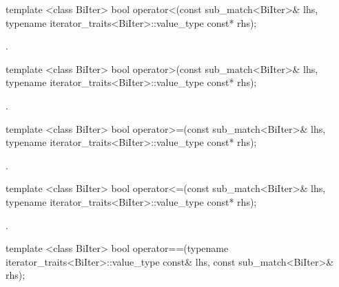 %
%
\begin{itemdecl}
template <class BiIter> 
  bool operator<(const sub_match<BiIter>& lhs, 
                 typename iterator_traits<BiIter>::value_type const* rhs); 
\end{itemdecl}

\begin{itemdescr}
\pnum\returns  {}.
\end{itemdescr}

%
%
\begin{itemdecl}
template <class BiIter> 
  bool operator>(const sub_match<BiIter>& lhs, 
                 typename iterator_traits<BiIter>::value_type const* rhs); 
\end{itemdecl}

\begin{itemdescr}
\pnum\returns  {}.
\end{itemdescr}

%
%
\begin{itemdecl}
template <class BiIter> 
  bool operator>=(const sub_match<BiIter>& lhs, 
                  typename iterator_traits<BiIter>::value_type const* rhs); 
\end{itemdecl}

\begin{itemdescr}
\pnum\returns  {}.
\end{itemdescr}

%
%
\begin{itemdecl}
template <class BiIter> 
  bool operator<=(const sub_match<BiIter>& lhs, 
                  typename iterator_traits<BiIter>::value_type const* rhs); 
\end{itemdecl}

\begin{itemdescr}
\pnum
\returns  {}.
\end{itemdescr}

%
%
\begin{itemdecl}
template <class BiIter> 
  bool operator==(typename iterator_traits<BiIter>::value_type const& lhs, 
                  const sub_match<BiIter>& rhs);
\end{itemdecl}

